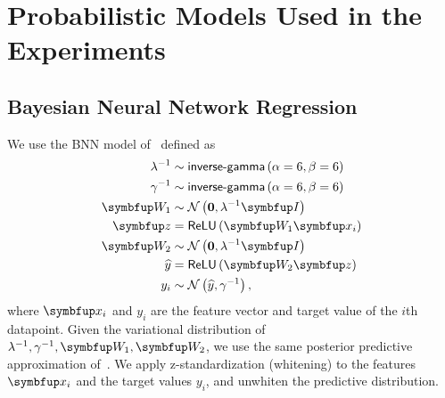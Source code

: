 
\section{Probabilistic Models Used in the Experiments}
\subsection{Bayesian Neural Network Regression}\label{section:model_bnn}
We use the BNN model of~\citet{pmlr-v37-hernandez-lobatoc15} defined as
\begin{align*}
  \lambda^{-1} &\sim \mathsf{inverse\text{-}gamma}\left(\alpha=6, \beta=6\right) \\
  \gamma^{-1}  &\sim \mathsf{inverse\text{-}gamma}\left(\alpha=6, \beta=6\right) \\
  \mW_1       &\sim \mathcal{N}\left(\mathbf{0}, \lambda^{-1} \mI \right) \\
  \vz         &= \mathsf{ReLU}\left(\mW_1 \vx_i\right) \\
  \mW_2       &\sim \mathcal{N}\left(\mathbf{0}, \lambda^{-1} \mI \right) \\
  \widehat{y} &= \mathsf{ReLU}\left(\mW_2 \vz\right) \\
  y_i         &\sim \mathcal{N}\left(\widehat{y}, \gamma^{-1}\right),
\end{align*}
where \(\vx_i\) and \(y_i\) are the feature vector and target value of the \(i\)th datapoint.
Given the variational distribution of \(\lambda^{-1}, \gamma^{-1}, \mW_1, \mW_2\), we use the same posterior predictive approximation of~\citet{pmlr-v37-hernandez-lobatoc15}.
We apply z-standardization (whitening) to the features \(\vx_i\) and the target values \(y_i\), and unwhiten the predictive distribution.

